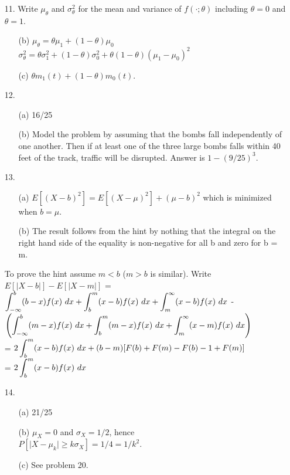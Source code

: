 \begin{enumerate}
	\item[11.] Write $\mu_\theta$ and $\sigma^2_\theta$ for the mean and variance of $f(\cdot;\theta)$ including $\theta =0$ and $\theta=1$. \begin{enumerate}
	\item[(b)] $\mu_\theta = \theta\mu_1 + (1-\theta)\mu_0$ \\
	$\sigma^2_\theta = \theta\sigma^2_1 + (1-\theta)\sigma^2_0 + \theta(1-\theta)(\mu_1-\mu_0)^2$
	
	\item[(c)] $\theta m_1(t) + (1-\theta)m_0(t)$.
	
	\end{enumerate}

	\item[12.] \begin{enumerate}
		\item[(a)] 16/25
		\item[(b)] Model the problem by assuming that the bombs fall independently of one another.  Then if at least one of the three large bombs falls within 40 feet of the track, traffic will be disrupted. Answer is $1 - (9/25)^3$.   
	\end{enumerate}

	\item[13.] \begin{enumerate}
		\item[(a)] $E[(X-b)^2] = E[(X-\mu)^2] + (\mu-b)^2$ which is minimized when $b = \mu$.
		\item[(b)] The result follows from the hint by nothing that the  integral on the right hand side of the equality is non-negative for all b and zero for b = m.
	\end{enumerate}

	\newpage
	To prove the hint assume $m < b$ ($m>b$ is similar).  Write $E[\vert X-b\vert] - E[\vert X-m\vert]$ = $\displaystyle \int_{-\infty}^b(b-x)f(x)\ dx + \int_b^m (x-b)f(x)\ dx + \int_m^\infty (x-b)f(x)\ dx$ - \\
	$\dsp \left( \int_{-\infty}^b(m-x)f(x)\ dx + \int_b^m (m-x)f(x)\ dx + \int_m^\infty (x-m)f(x)\ dx\right)$ \\
	= $2\displaystyle \int_b^m (x-b)f(x)\ dx + (b-m)[F(b) + F(m) - F(b) -1 + F(m)]$ \\
	= $2\displaystyle \int_b^m (x-b)f(x)\  dx$

	\item[14.] \begin{enumerate}
		\item[(a)] 21/25
		\item[(b)] $\mu_X = 0$ and $\sigma_X = 1/2$,  hence \\
		$P[\vert X-\mu_k\vert \ge k\sigma_X] = 1/4 = 1/k^2$.
		\item[(c)] See problem 20.
	\end{enumerate}



\end{enumerate}
